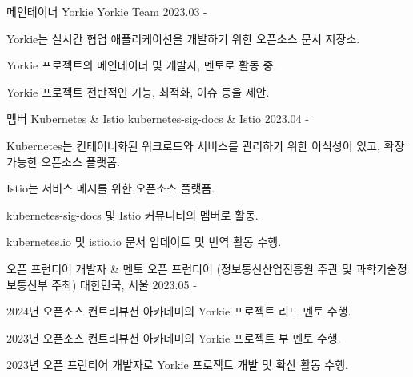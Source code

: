 

\begin{cventries}

  \cventry
    {메인테이너} %
    {Yorkie} %
    {Yorkie Team} %
    {2023.03 - } %
    {
      \begin{cvitems} %
        \item {Yorkie는 실시간 협업 애플리케이션을 개발하기 위한 오픈소스 문서 저장소.}
        \item {Yorkie 프로젝트의 메인테이너 및 개발자, 멘토로 활동 중.}
        \item {Yorkie 프로젝트 전반적인 기능, 최적화, 이슈 등을 제안.}
      \end{cvitems}
    }

  \cventry
  {멤버} %
  {Kubernetes \& Istio} %
  {kubernetes-sig-docs \& Istio} %
  {2023.04 - } %
  {
    \begin{cvitems} %
      \item {Kubernetes는 컨테이너화된 워크로드와 서비스를 관리하기 위한 이식성이 있고, 확장 가능한 오픈소스 플랫폼.}
      \item {Istio는 서비스 메시를 위한 오픈소스 플랫폼.}
      \item {kubernetes-sig-docs 및 Istio 커뮤니티의 멤버로 활동.}
      \item {kubernetes.io 및 istio.io 문서 업데이트 및 번역 활동 수행.}
    \end{cvitems}
  }

\cventry
    {오픈 프런티어 개발자 \& 멘토} %
    {오픈 프런티어 (정보통신산업진흥원 주관 및 과학기술정보통신부 주최)} %
    {대한민국, 서울} %
    {2023.05 - } %
    {
      \begin{cvitems} %
        \item {2024년 오픈소스 컨트리뷰션 아카데미의 Yorkie 프로젝트 리드 멘토 수행.}
        \item {2023년 오픈소스 컨트리뷰션 아카데미의 Yorkie 프로젝트 부 멘토 수행.}
        \item {2023년 오픈 프런티어 개발자로 Yorkie 프로젝트 개발 및 확산 활동 수행.}
      \end{cvitems}
    }
    

\end{cventries}
